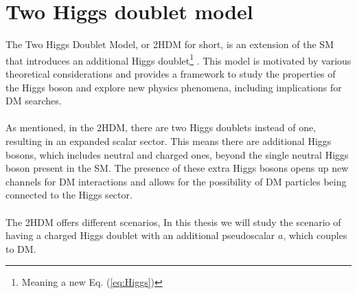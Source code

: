 \documentclass[12pt, a4paper]{book}
\begin{document}
\newpage
\section{Two Higgs doublet model}
The Two Higgs Doublet Model, or 2HDM for short, is an extension of the SM that introduces an additional Higgs doublet\footnote{Meaning a new Eq. (\ref{eq:Higgs})} \cite{Branco:2011iw}. This model is motivated by various theoretical considerations and provides a framework to study the 
properties of the Higgs boson and explore new physics phenomena, including implications for DM searches.\\
\\As mentioned, in the 2HDM, there are two Higgs doublets instead of one, resulting in an expanded scalar sector. This means there are additional Higgs bosons, which includes neutral and charged ones, beyond the single neutral Higgs boson present in the SM. The presence of 
these extra Higgs bosons opens up new channels for DM interactions and allows for the possibility of DM particles being connected to the Higgs sector.\\
\\The 2HDM offers different scenarios, In this thesis we will study the scenario of having a charged Higgs doublet with an additional pseudoscalar $a$, which couples to DM. 
\end{document}
